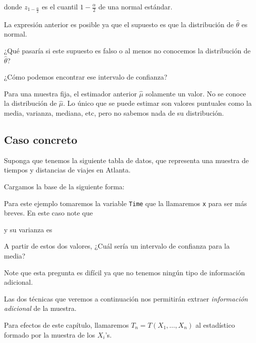 \documentclass[12pt]{book}\usepackage[]{graphicx}\usepackage[]{color}
\theoremstyle{definition}
\theoremstyle{plain}
\begin{document}
donde \(z_{1-\frac{\alpha}{2}}\) es el cuantil \(1-\frac{\alpha}{2}\)
de una normal estándar.

La expresión anterior es posible ya que el supuesto es que la
distribución de \(\hat{\theta}\) es normal.

\begin{pregunta}{}{}
    ¿Qué pasaría si este supuesto es falso o al menos no conocemos la
    distribución de \(\hat{\theta}\)?

    ¿Cómo podemos encontrar ese intervalo de confianza?
\end{pregunta}

\begin{cuidado}{}{}
    Para una muestra fija, el estimador anterior  \(\hat{\mu}\)
    solamente un valor.  No se conoce la distribución de \(\hat{\mu}\). Lo
    único que se puede estimar son valores puntuales como la media,
    varianza, mediana, etc, pero no sabemos nada de su distribución.
\end{cuidado}

\subsection{Caso concreto}

Suponga que tenemos la siguiente tabla de datos, que representa una
muestra de tiempos y distancias de viajes en Atlanta.

Cargamos la base de la siguiente forma:



Para este ejemplo tomaremos la variable \texttt{Time} que la
llamaremos \texttt{x} para ser más breves. En este caso note que





y su varianza es



A partir de estos dos valores, ¿Cuál sería un intervalo de confianza
para la media?

Note que esta pregunta es difícil ya que no tenemos ningún tipo de
información adicional.

Las dos técnicas que veremos a continuación nos permitirán extraer
\emph{información adicional} de la muestra.

\begin{nota}{}{}
    Para efectos de este capítulo, llamaremos \(T_{n}=T\left(
    X_{1},\ldots,X_{n}\right)\) al estadístico formado por la muestra de
    los \(X_{i}\)'s.
\end{nota}
\end{document}
